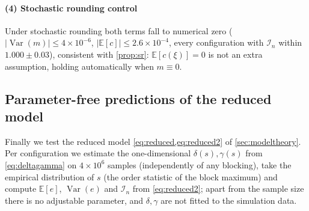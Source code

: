 \documentclass[review,hidelinks,oneeqnum,onetabnum,onefignum,onethmnum]{siamart251216}
\begin{document}
\paragraph{(4) Stochastic rounding control} Under stochastic rounding both terms
fall to numerical zero ($|\operatorname{Var}(m)|\le4\times10^{-6}$,
$|\mathbb{E}[c]|\le2.6\times10^{-4}$, every configuration with $\mathcal I_n$
within $1.000\pm0.03$), consistent with \cref{prop:sr}: $\mathbb{E}[c(\xi)]=0$ is
not an extra assumption, holding automatically when $m\equiv0$.

\subsection{Parameter-free predictions of the reduced model}
\label{sec:model}

Finally we test the reduced model \cref{eq:reduced,eq:reduced2} of
\cref{sec:modeltheory}. Per configuration we estimate the one-dimensional
$\delta(s),\gamma(s)$ from \cref{eq:deltagamma} on $4\times10^6$ samples
(independently of any blocking), take the empirical distribution of $s$ (the
order statistic of the block maximum) and compute $\mathbb{E}[e]$,
$\operatorname{Var}(e)$ and $\mathcal I_n$ from \cref{eq:reduced2}; apart from
the sample size there is no adjustable parameter, and $\delta,\gamma$ are not
fitted to the simulation data.
\end{document}
